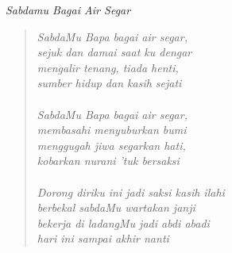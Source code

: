 \scriptsize
\begin{center}
\itshape{Sabdamu Bagai Air Segar}
\end{center}

\begin{verse}
	\itshape{
SabdaMu Bapa bagai air segar, \\
sejuk dan damai saat ku dengar\\
mengalir tenang, tiada henti, \\
sumber hidup dan kasih sejati\\
{~}\\
SabdaMu Bapa bagai air segar, \\
membasahi menyuburkan bumi\\
menggugah jiwa segarkan hati,\\ 
kobarkan nurani 'tuk bersaksi\\
{~}\\
Dorong diriku ini jadi saksi kasih ilahi\\
berbekal sabdaMu wartakan janji\\
bekerja di ladangMu jadi abdi abadi\\
hari ini sampai akhir nanti\\
}
\end{verse}
\normalsize